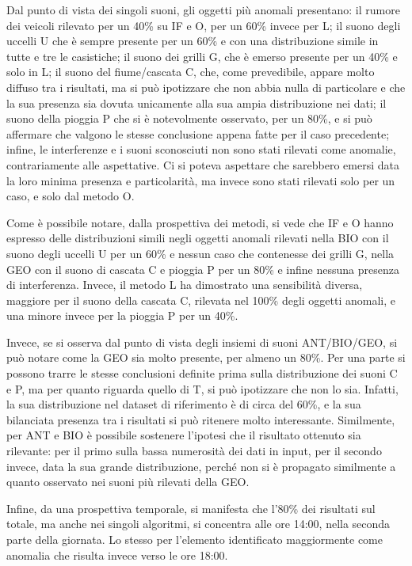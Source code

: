 Dal punto di vista dei singoli suoni, gli oggetti più anomali presentano: il rumore dei veicoli
rilevato per un 40\% su IF e O, per un 60\% invece per L; il suono degli uccelli U che è sempre
presente per un 60\% e con una distribuzione simile in tutte e tre le casistiche; il suono dei
grilli G, che è emerso presente per un 40\% e solo in L; il suono del fiume/cascata C, che,
come prevedibile, appare molto diffuso tra i risultati, ma si può ipotizzare che non abbia nulla
di particolare e che la sua presenza sia dovuta unicamente alla sua ampia distribuzione nei
dati; il suono della pioggia P che si è notevolmente osservato, per un 80\%, e si può affermare
che valgono le stesse conclusione appena fatte per il caso precedente; infine, le interferenze e
i suoni sconosciuti non sono stati rilevati come anomalie, contrariamente alle aspettative. Ci
si poteva aspettare che sarebbero emersi data la loro minima presenza e particolarità, ma
invece sono stati rilevati solo per un caso, e solo dal metodo O.

Come è possibile notare, dalla prospettiva dei metodi, si vede che IF e O hanno espresso delle
distribuzioni simili negli oggetti anomali rilevati nella BIO con il suono degli uccelli U per un
60\% e nessun caso che contenesse dei grilli G, nella GEO con il suono di cascata C e pioggia
P per un 80\% e infine nessuna presenza di interferenza. Invece, il metodo L ha dimostrato
una sensibilità diversa, maggiore per il suono della cascata C, rilevata nel 100\% degli oggetti
anomali, e una minore invece per la pioggia P per un 40\%.

Invece, se si osserva dal punto di vista degli insiemi di suoni ANT/BIO/GEO, si può notare
come la GEO sia molto presente, per almeno un 80\%. Per una parte si possono trarre le stesse
conclusioni definite prima sulla distribuzione dei suoni C e P, ma per quanto riguarda quello
di T, si può ipotizzare che non lo sia. Infatti, la sua distribuzione nel dataset di riferimento è
di circa del 60\%, e la sua bilanciata presenza tra i risultati si può ritenere molto interessante.
Similmente, per ANT e BIO è possibile sostenere l’ipotesi che il risultato ottenuto sia
rilevante: per il primo sulla bassa numerosità dei dati in input, per il secondo invece, data la
sua grande distribuzione, perché non si è propagato similmente a quanto osservato nei suoni
più rilevati della GEO.

Infine, da una prospettiva temporale, si manifesta che l’80\% dei risultati sul totale, ma anche
nei singoli algoritmi, si concentra alle ore 14:00, nella seconda parte della giornata. Lo stesso
per l’elemento identificato maggiormente come anomalia che risulta invece verso le ore
18:00.

